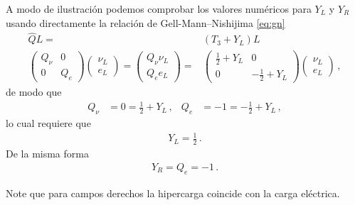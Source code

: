 \begin{frame}
A modo de ilustración podemos comprobar
los valores numéricos para $Y_L$ y $Y_R$ usando directamente la relación de Gell-Mann--Nishijima \eqref{eq:gn}
\begin{align}
  \widehat{Q}L=&(T_3+Y_L)L \nonumber\\
  \begin{pmatrix}
    Q_\nu & 0\\
    0  & Q_e
  \end{pmatrix}
  \begin{pmatrix}
    \nu_L\\
    e_L
  \end{pmatrix}=  
  \begin{pmatrix}
   Q_{\nu} \nu_L\\
   Q_e e_L
  \end{pmatrix}
= & \begin{pmatrix}
    \frac{1}{2} + Y_L & 0\\
    0  & -\frac{1}{2}+Y_L
  \end{pmatrix}  \begin{pmatrix}
    \nu_L\\
    e_L
  \end{pmatrix} \,,
\end{align}
de modo que
\begin{align}
  Q_{\nu}&=0=\frac{1}{2}+Y_L\,, & Q_e&=-1=-\frac{1}{2}+Y_L\,,
\end{align}
lo cual  requiere que
\begin{align}
  Y_L=\frac{1}{2}\,.
\end{align}
De la misma forma
\begin{align}
  Y_R=Q_e=-1\,.
\end{align}
\end{frame}
Note que para campos derechos la hipercarga coincide con la carga eléctrica.

